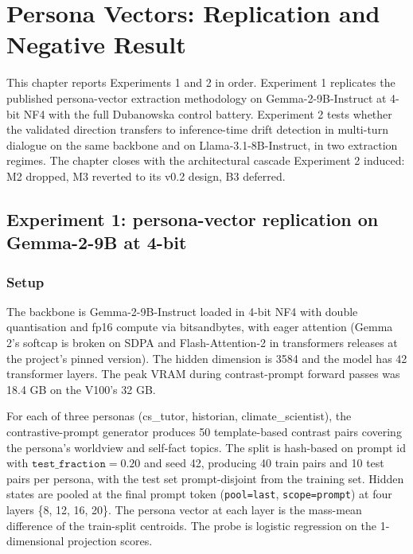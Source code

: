 \chapter{Persona Vectors: Replication and Negative Result}
\label{ch:replication}

This chapter reports Experiments 1 and 2 in order. Experiment 1 replicates the published persona-vector extraction methodology on Gemma-2-9B-Instruct at 4-bit NF4 with the full Dubanowska control battery. Experiment 2 tests whether the validated direction transfers to inference-time drift detection in multi-turn dialogue on the same backbone and on Llama-3.1-8B-Instruct, in two extraction regimes. The chapter closes with the architectural cascade Experiment 2 induced: M2 dropped, M3 reverted to its v0.2 design, B3 deferred.

\section{Experiment 1: persona-vector replication on Gemma-2-9B at 4-bit}
\label{sec:experiment-1}

\subsection{Setup}

The backbone is Gemma-2-9B-Instruct\autocite{gemma2024} loaded in 4-bit NF4 with double quantisation and fp16 compute via bitsandbytes\autocite{bitsandbytes}, with eager attention (Gemma 2's softcap is broken on SDPA and Flash-Attention-2 in transformers releases at the project's pinned version)\autocite{transformers}. The hidden dimension is 3584 and the model has 42 transformer layers. The peak VRAM during contrast-prompt forward passes was 18.4 GB on the V100's 32 GB.

For each of three personas (cs\_tutor, historian, climate\_scientist), the contrastive-prompt generator produces 50 template-based contrast pairs covering the persona's worldview and self-fact topics. The split is hash-based on prompt id with $\texttt{test\_fraction} = 0.20$ and seed 42, producing 40 train pairs and 10 test pairs per persona, with the test set prompt-disjoint from the training set. Hidden states are pooled at the final prompt token (\texttt{pool=last}, \texttt{scope=prompt}) at four layers \{8, 12, 16, 20\}. The persona vector at each layer is the mass-mean difference of the train-split centroids. The probe is logistic regression on the 1-dimensional projection scores.

